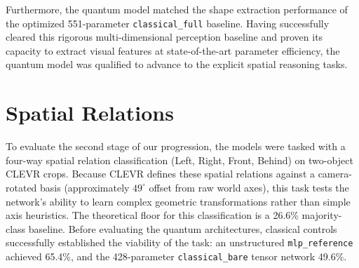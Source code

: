 \documentclass[12pt, a4paper, oneside]{report}
\begin{document}
Furthermore, the quantum model matched the shape extraction performance of the optimized 551-parameter \texttt{classical\_full} baseline. Having successfully cleared this rigorous multi-dimensional perception baseline and proven its capacity to extract visual features at state-of-the-art parameter efficiency, the quantum model was qualified to advance to the explicit spatial reasoning tasks.

\section{Spatial Relations}

To evaluate the second stage of our progression, the models were tasked with a four-way spatial relation classification (Left, Right, Front, Behind) on two-object CLEVR crops. Because CLEVR defines these spatial relations against a camera-rotated basis (approximately $49^\circ$ offset from raw world axes), this task tests the network's ability to learn complex geometric transformations rather than simple axis heuristics. The theoretical floor for this classification is a 26.6\% majority-class baseline. Before evaluating the quantum architectures, classical controls successfully established the viability of the task: an unstructured \texttt{mlp\_reference} achieved 65.4\%, and the 428-parameter \texttt{classical\_bare} tensor network 49.6\%. 
\end{document}
